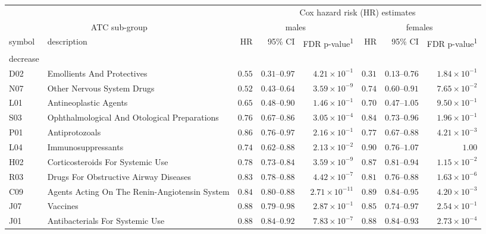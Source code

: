 \captionsetup[table]{labelformat=empty,skip=1pt}
\setlength{\LTpost}{0mm}
\begin{longtable}{llrrrrrr}
\toprule
 &  & \multicolumn{6}{c}{Cox hazard risk (HR) estimates} \\ 
\cmidrule(lr){3-8}
\multicolumn{2}{c}{ATC sub-group} & \multicolumn{3}{c}{males} & \multicolumn{3}{c}{females} \\ 
\cmidrule(lr){1-2} \cmidrule(lr){3-5} \cmidrule(lr){6-8}
symbol & description & HR & 95\% CI & FDR p-value\textsuperscript{1} & HR & 95\% CI & FDR p-value\textsuperscript{1} \\ 
\midrule
\multicolumn{1}{l}{decrease} \\ 
\midrule
D02 & Emollients And Protectives & $0.55$ & $0.31$–$0.97$ & $4.21 \times 10^{-1}$ & $0.31$ & $0.13$–$0.76$ & $1.84 \times 10^{-1}$ \\ 
N07 & Other Nervous System Drugs & $0.52$ & $0.43$–$0.64$ & $3.59 \times 10^{-9}$ & $0.74$ & $0.60$–$0.91$ & $7.65 \times 10^{-2}$ \\ 
L01 & Antineoplastic Agents & $0.65$ & $0.48$–$0.90$ & $1.46 \times 10^{-1}$ & $0.70$ & $0.47$–$1.05$ & $9.50 \times 10^{-1}$ \\ 
S03 & Ophthalmological And Otological Preparations & $0.76$ & $0.67$–$0.86$ & $3.05 \times 10^{-4}$ & $0.84$ & $0.73$–$0.96$ & $1.96 \times 10^{-1}$ \\ 
P01 & Antiprotozoals & $0.86$ & $0.76$–$0.97$ & $2.16 \times 10^{-1}$ & $0.77$ & $0.67$–$0.88$ & $4.21 \times 10^{-3}$ \\ 
L04 & Immunosuppressants & $0.74$ & $0.62$–$0.88$ & $2.13 \times 10^{-2}$ & $0.90$ & $0.76$–$1.07$ & $1.00$ \\ 
H02 & Corticosteroids For Systemic Use & $0.78$ & $0.73$–$0.84$ & $3.59 \times 10^{-9}$ & $0.87$ & $0.81$–$0.94$ & $1.15 \times 10^{-2}$ \\ 
R03 & Drugs For Obstructive Airway Diseases & $0.83$ & $0.78$–$0.88$ & $4.42 \times 10^{-7}$ & $0.81$ & $0.76$–$0.88$ & $1.63 \times 10^{-6}$ \\ 
C09 & Agents Acting On The Renin-Angiotensin System & $0.84$ & $0.80$–$0.88$ & $2.71 \times 10^{-11}$ & $0.89$ & $0.84$–$0.95$ & $4.20 \times 10^{-3}$ \\ 
J07 & Vaccines & $0.88$ & $0.79$–$0.98$ & $2.87 \times 10^{-1}$ & $0.85$ & $0.74$–$0.97$ & $2.54 \times 10^{-1}$ \\ 
J01 & Antibacterials For Systemic Use & $0.88$ & $0.84$–$0.92$ & $7.83 \times 10^{-7}$ & $0.88$ & $0.84$–$0.93$ & $2.73 \times 10^{-4}$ \\ 

\end{longtable}

